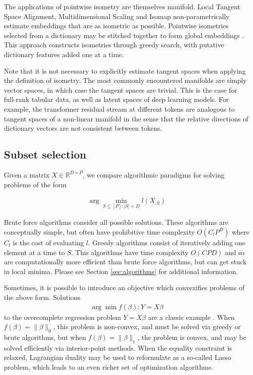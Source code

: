The applications of pointwise isometry are themselves manifold.
Local Tangent Space Alignment, Multidimensional Scaling and Isomap non-parametrically estimate embeddings that are as isometric as possible.
Pointwise isometries selected from a dictionary may be stitched together to form global embeddings \citep{Kohli2021-lr}.
This approach constructs isometries through greedy search, with putative dictionary features added one at a time.

Note that it is not necessary to explicitly estimate tangent spaces when applying the definition of isometry.
The most commonly encountered manifolds are simply vector spaces, in which case the tangent spaces are trivial.
This is the case for full-rank tabular data, as well as latent spaces of deep learning models.
For example, the transformer residual stream at different tokens are analogous to tangent spaces of a non-linear manifold in the sense that the relative directions of dictionary vectors are not consistent between tokens.

\subsection{Subset selection}

Given a matrix $ X \in \mathbb R^{D \times P}$, we compare algorithmic paradigms for solving problems of the form

\begin{align}
\label{prog:ground_truth}
\arg \min_{ S \subseteq [P] : | S| = D} l ( X_{. S})
\end{align}

Brute force algorithms consider all possible solutions.
These algorithms are conceptually simple, but often have prohibitive time complexity $O(C_lP^D)$ where $C_l$ is the cost of evaluating $l$.
Greedy algorithms consist of iteratively adding one element at a time to $ S$.
This algorithms have time complexity $O(CPD)$ and so are computationally more efficient than brute force algorithms, but can get stuck in local minima.
Please see Section \ref{sec:algorithms} for additional information.

Sometimes, it is possible to introduce an objective which convexifies problems of the above form.
Solutions
\begin{align}
\arg \min f(\beta) : Y  = X\beta 
\end{align}
to the overcomplete regression problem $Y = X \beta$ are a classic example \cite{Chen2001-hh}.
When $f(\beta) = \|\beta\|_0$, this problem is non-convex, and must be solved via greedy or brute algorithms, but when $f(\beta) =\|\beta\|_1$, the problem is convex, and may be solved efficiently via interior-point methods.
When the equality constraint is relaxed, Lagrangian duality may be used to reformulate as a so-called Lasso problem, which leads to an even richer set of optimization algorithms. %


